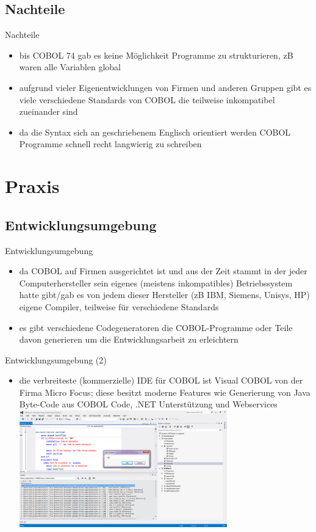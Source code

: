 \documentclass[handout]{beamer}
\begin{document}
\subsection{Nachteile}

\begin{frame}{Nachteile}
	\begin{itemize}
		\item
		    bis COBOL 74 gab es keine M\"oglichkeit Programme zu strukturieren, zB waren alle Variablen global
		\item
			aufgrund vieler Eigenentwicklungen von Firmen und anderen Gruppen gibt es viele verschiedene Standards von COBOL die teilweise inkompatibel zueinander sind
		\item
			da die Syntax sich an geschriebenem Englisch orientiert werden COBOL Programme schnell recht langwierig zu schreiben
	\end{itemize}
\end{frame}

\section{Praxis}

\subsection{Entwicklungsumgebung}

\begin{frame}{Entwicklungsumgebung}
	\begin{itemize}
		\item
			da COBOL auf Firmen ausgerichtet ist und aus der Zeit stammt in der jeder Computerhersteller sein eigenes (meistens inkompatibles) Betriebssystem hatte gibt/gab es von jedem dieser Hersteller (zB IBM, Siemens, Unisys, HP) eigene Compiler, teilweise f\"ur verschiedene Standards
		\item
			es gibt verschiedene Codegeneratoren die COBOL-Programme oder Teile davon generieren um die Entwicklungsarbeit zu erleichtern
	\end{itemize}
\end{frame}

\begin{frame}{Entwicklungsumgebung (2)}
	\begin{itemize}			
		\item
			die verbreiteste (kommerzielle) IDE für COBOL ist Visual COBOL von der Firma Micro Focus; diese besitzt moderne Features wie Generierung von Java Byte-Code aus COBOL Code, .NET Unterstützung und Webservices
		\includegraphics[width=9cm]{VisualCOBOL2}
	\end{itemize}
\end{frame}
\end{document}
